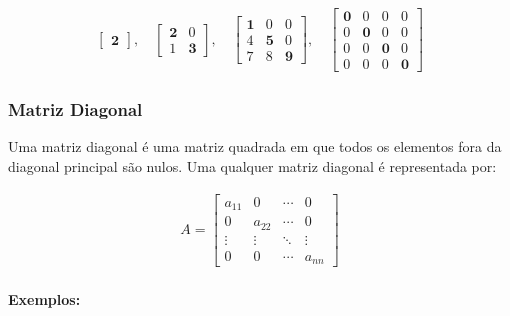 \[
    \begin{matrix}
        \begin{bmatrix}
            \mathbf{2}
        \end{bmatrix},
        \quad
        \begin{bmatrix}
            \mathbf{2} & 0          \\
            1          & \mathbf{3}
        \end{bmatrix},
        \quad
        \begin{bmatrix}
            \mathbf{1} & 0          & 0          \\
            4          & \mathbf{5} & 0          \\
            7          & 8          & \mathbf{9}
        \end{bmatrix},
        \quad
        \begin{bmatrix}
            \mathbf{0} & 0          & 0          & 0          \\
            0          & \mathbf{0} & 0          & 0          \\
            0          & 0          & \mathbf{0} & 0          \\
            0          & 0          & 0          & \mathbf{0}
        \end{bmatrix}
    \end{matrix}
\]

\subsubsection{Matriz Diagonal}
\indent

Uma matriz diagonal é uma matriz quadrada em que todos os elementos fora da diagonal principal são nulos. Uma qualquer matriz diagonal é representada por:

\[
    \begin{matrix}
        A = \begin{bmatrix}
                a_{11} & 0      & \cdots & 0      \\
                0      & a_{22} & \cdots & 0      \\
                \vdots & \vdots & \ddots & \vdots \\
                0      & 0      & \cdots & a_{nn}
            \end{bmatrix}
    \end{matrix}
\]

\paragraph{Exemplos:}

